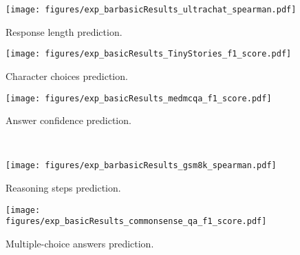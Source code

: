 \begin{figure*}[tb!] 
    \renewcommand{\thesubfigure}{\alph{mycounter}}
    \centering
    \setcounter{mycounter}{1}
    \begin{subfigure}[b]{0.32\linewidth}
        \centering
        \texttt{[image: figures/exp\_barbasicResults\_ultrachat\_spearman.pdf]}
        \vspace{-15pt}
        \caption{Response length prediction.}
        \label{fig:exp_bar_response_length_inDataset}
    \end{subfigure}
    \hfill
    \setcounter{mycounter}{3}
    \begin{subfigure}[b]{0.32\linewidth}
        \centering
        \texttt{[image: figures/exp\_basicResults\_TinyStories\_f1\_score.pdf]}
        \vspace{-15pt}
        \caption{Character choices prediction.}
        \label{fig:exp_character_choices_inDataset}
    \end{subfigure}
    \hfill  %
    \setcounter{mycounter}{5}
    \begin{subfigure}[b]{0.32\linewidth}
        \centering
        \texttt{[image: figures/exp\_basicResults\_medmcqa\_f1\_score.pdf]}
        \vspace{-15pt}
        \caption{Answer confidence prediction.}
        \label{fig:exp_answer_confidence_inDataset}
    \end{subfigure}
    \\
    \setcounter{mycounter}{2}
    \begin{subfigure}[b]{0.32\linewidth}
        \centering
        \texttt{[image: figures/exp\_barbasicResults\_gsm8k\_spearman.pdf]}
        \vspace{-15pt}
        \caption{Reasoning steps prediction.}
        \label{fig:exp_bar_reasoning_steps_inDataset}
    \end{subfigure}
    \hfill
    \setcounter{mycounter}{4}
    \begin{subfigure}[b]{0.32\linewidth}
        \centering
        \texttt{[image: figures/exp\_basicResults\_commonsense\_qa\_f1\_score.pdf]}
        \vspace{-15pt}
        \caption{Multiple-choice answers prediction.}
        \label{fig:exp_multiplechoice_answers_inDataset}
    \end{subfigure}
    \hfill  %
    \setcounter{mycounter}{6}

\end{figure*}
